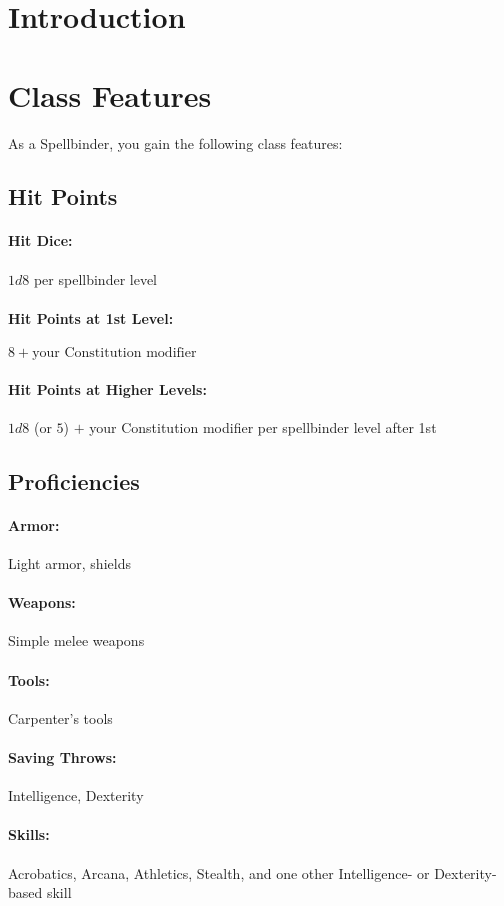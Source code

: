 \section{Introduction}

\section{Class Features}

As a Spellbinder, you gain the following class features:

\subsection{Hit Points}
\paragraph{Hit Dice:} $1d8$ per spellbinder level
\paragraph{Hit Points at 1st Level:} $8 +\text{your Constitution modifier}$
\paragraph{Hit Points at Higher Levels:} $1d8$ (or $5$) $+$ your Constitution modifier per spellbinder level after 1st

\subsection{Proficiencies}
\paragraph{Armor:} Light armor, shields
\paragraph{Weapons:} Simple melee weapons
\paragraph{Tools:} Carpenter's tools
\paragraph{Saving Throws:} Intelligence, Dexterity
\paragraph{Skills:} Acrobatics, Arcana, Athletics, Stealth, and one other Intelligence- or Dexterity-based skill 

